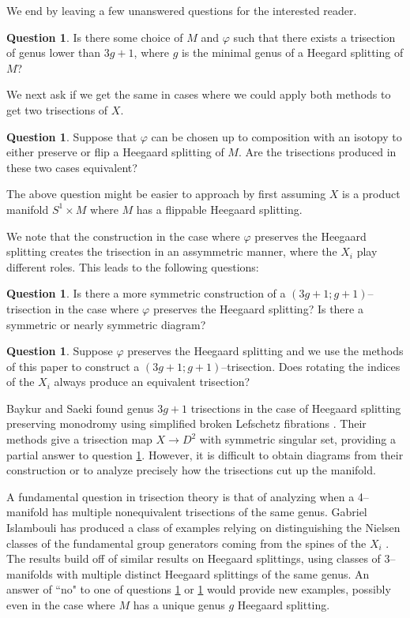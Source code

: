 \documentclass[12pt]{amsart}
\theoremstyle{definition}
\newtheorem{question}[thm]{Question}
\theoremstyle{remark}
\begin{document}
We end by leaving a few unanswered questions for the interested reader.  
\begin{question}
Is there some choice of $M$ and $\varphi$ such that there exists a trisection of genus lower than $3g+1$, where $g$ is the minimal genus of a Heegard splitting of $M$?
\end{question}

We next ask if we get the same in cases where we could apply both methods to get two trisections of $X$.

\begin{question}
Suppose that $\varphi$ can be chosen up to composition with an isotopy to either preserve or flip a Heegaard splitting of $M$.   Are the trisections produced in these two cases equivalent?
\label{unequal1}
\end{question}

The above question might be easier to approach by first assuming $X$ is a product manifold $S^1 \times M$ where $M$ has a flippable Heegaard splitting.  

We note that the construction in the case where $\varphi$ preserves the Heegaard splitting creates the trisection in an assymmetric manner, where the $X_i$ play different roles.  This leads to the following questions:
\begin{question}
\label{q_assym}
Is there a more symmetric construction of a $(3g+1;g+1)$--trisection in the case where $\varphi$ preserves the Heegaard splitting?  Is there a symmetric or nearly symmetric diagram?
\end{question}

\begin{question}
Suppose $\varphi$ preserves the Heegaard splitting and we use the methods of this paper to construct a $(3g+1;g+1)$--trisection.  Does rotating the indices of the $X_i$ always produce an equivalent trisection?
\label{unequal3}
\end{question}

Baykur and Saeki found genus $3g+1$ trisections in the case of Heegaard splitting preserving monodromy using simplified broken Lefschetz fibrations \cite{BaykurSaeki1}.  Their methods give a trisection map $X \to D^2$ with symmetric singular set, providing a partial answer to question \ref{q_assym}.  However, it is difficult to obtain diagrams from their construction or to analyze precisely how the trisections cut up the manifold.


A fundamental question in trisection theory is that of analyzing when a 4--manifold has multiple nonequivalent trisections of the same genus.  Gabriel Islambouli has produced a class of examples relying on distinguishing the Nielsen classes of the fundamental group generators coming from the spines of the $X_i$ \cite{Islambouli1}.  The results build off of similar results on Heegaard splittings, using classes of 3--manifolds with multiple distinct Heegaard splittings of the same genus.  An answer of ``no" to one of questions \ref{unequal1} or \ref{unequal3} would provide new examples, possibly even in the case where $M$ has a unique genus $g$ Heegaard splitting.  
\end{document}
